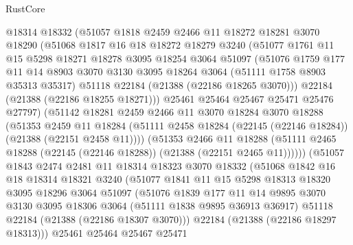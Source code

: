 \begin{lexlean}{RustCore}
\begin{coremodule}
        @18314
        @18332
        (@51057
          @1818
          @2459
          @2466
          @11
          @18272
          @18281
          @3070
          @18290
          (@51068
            @1817
            @16
            @18
            @18272
            @18279
            @3240
            (@51077
              @1761
              @11
              @15
              @5298
              @18271
              @18278
              @3095
              @18254
              @3064
              @51097
              (@51076
                @1759
                @177
                @11
                @14
                @8903
                @3070
                @3130
                @3095
                @18264
                @3064
                (@51111 @1758 @8903 @35313 @35317)
                @51118
                @22184
                (@21388 (@22186 @18265 @3070)))
              @22184
              (@21388 (@22186 @18255 @18271)))
            @25461
            @25464
            @25467
            @25471
            @25476
            @27797)
          (@51142
            @18281
            @2459
            @2466
            @11
            @3070
            @18284
            @3070
            @18288
            (@51353
              @2459
              @11
              @18284
              (@51111 @2458 @18284 (@22145 (@22146 @18284)) (@21388 (@22151 @2458 @11))))
            (@51353
              @2466
              @11
              @18288
              (@51111 @2465 @18288 (@22145 (@22146 @18288)) (@21388 (@22151 @2465 @11))))))
        (@51057
          @1843
          @2474
          @2481
          @11
          @18314
          @18323
          @3070
          @18332
          (@51068
            @1842
            @16
            @18
            @18314
            @18321
            @3240
            (@51077
              @1841
              @11
              @15
              @5298
              @18313
              @18320
              @3095
              @18296
              @3064
              @51097
              (@51076
                @1839
                @177
                @11
                @14
                @9895
                @3070
                @3130
                @3095
                @18306
                @3064
                (@51111 @1838 @9895 @36913 @36917)
                @51118
                @22184
                (@21388 (@22186 @18307 @3070)))
              @22184
              (@21388 (@22186 @18297 @18313)))
            @25461
            @25464
            @25467
            @25471

\end{coremodule}
\end{lexlean}
